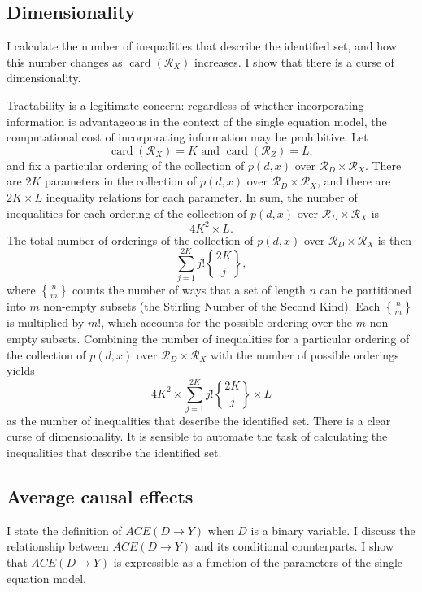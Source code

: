 \documentclass[12pt,a4paper,twoside]{article}
\DeclareRobustCommand{\stirling}{\genfrac\{\}{0pt}{}}
\DeclareMathOperator*{\card}{card}
\numberwithin{equation}{section}
\begin{document}
\subsection{Dimensionality}
I calculate the number of inequalities that describe the identified set, and how this number changes as $\card (\mathcal{R}_X)$ increases. I show that there is a curse of dimensionality.

Tractability is a legitimate concern: regardless of whether incorporating information is advantageous in the context of the single equation model, the computational cost of incorporating information may be prohibitive. Let
\[\card (\mathcal{R}_X)=K\text{ and }\card (\mathcal{R}_Z)=L,\]
and fix a particular ordering of the collection of $p(d,x)$ over $\mathcal{R}_D\times\mathcal{R}_X$. There are $2K$ parameters in the collection  of $p(d,x)$ over $\mathcal{R}_D\times\mathcal{R}_X$, and there are $2K\times L$ inequality relations for each parameter. In sum, the number of inequalities for each ordering of the collection of $p(d,x)$ over $\mathcal{R}_D\times\mathcal{R}_X$ is
\[4K^2\times L.\]
The total number of orderings of the collection of $p(d,x)$ over $\mathcal{R}_D\times\mathcal{R}_X$ is then
\[\sum_{j=1}^{2K}j!\stirling{2K}{j},\]
where $\stirling{n}{m}$ counts the number of ways that a set of length $n$ can be partitioned into $m$ non-empty subsets (the Stirling Number of the Second Kind). Each $\stirling{n}{m}$ is multiplied by $m!$, which accounts for the possible ordering over the $m$ non-empty subsets. Combining the number of inequalities for a particular ordering of the collection of $p(d,x)$ over $\mathcal{R}_D\times\mathcal{R}_X$ with the number of possible orderings yields
\[4K^2\times\sum_{j=1}^{2K}j!\stirling{2K}{j}\times L\]
as the number of inequalities that describe the identified set. There is a clear curse of dimensionality. It is sensible to automate the task of calculating the inequalities that describe the identified set.
\subsection{Average causal effects}
I state the definition of $ACE(D\rightarrow Y)$ when $D$ is a binary variable. I discuss the relationship between $ACE(D\rightarrow Y)$ and its conditional counterparts. I show that $ACE(D\rightarrow Y)$ is expressible as a function of the parameters of the single equation model.
\end{document}
